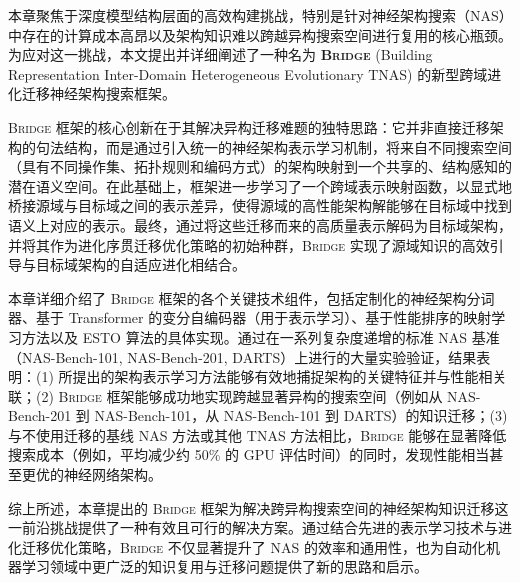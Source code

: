 \documentclass[../main.tex]{subfiles}
\begin{document}
\label{sec:bridge-conclusion}

本章聚焦于深度模型结构层面的高效构建挑战，特别是针对神经架构搜索（NAS）中存在的计算成本高昂以及架构知识难以跨越异构搜索空间进行复用的核心瓶颈。为应对这一挑战，本文提出并详细阐述了一种名为 \textbf{\textsc{Bridge}} (Building Representation Inter-Domain Heterogeneous Evolutionary TNAS) 的新型跨域进化迁移神经架构搜索框架。

\textsc{Bridge} 框架的核心创新在于其解决异构迁移难题的独特思路：它并非直接迁移架构的句法结构，而是通过引入统一的神经架构表示学习机制，将来自不同搜索空间（具有不同操作集、拓扑规则和编码方式）的架构映射到一个共享的、结构感知的潜在语义空间。在此基础上，框架进一步学习了一个跨域表示映射函数，以显式地桥接源域与目标域之间的表示差异，使得源域的高性能架构解能够在目标域中找到语义上对应的表示。最终，通过将这些迁移而来的高质量表示解码为目标域架构，并将其作为进化序贯迁移优化策略的初始种群，\textsc{Bridge} 实现了源域知识的高效引导与目标域架构的自适应进化相结合。

本章详细介绍了 \textsc{Bridge} 框架的各个关键技术组件，包括定制化的神经架构分词器、基于 Transformer 的变分自编码器（用于表示学习）、基于性能排序的映射学习方法以及 ESTO 算法的具体实现。通过在一系列复杂度递增的标准 NAS 基准（NAS-Bench-101, NAS-Bench-201, DARTS）上进行的大量实验验证，结果表明：(1) 所提出的架构表示学习方法能够有效地捕捉架构的关键特征并与性能相关联；(2) \textsc{Bridge} 框架能够成功地实现跨越显著异构的搜索空间（例如从 NAS-Bench-201 到 NAS-Bench-101，从 NAS-Bench-101 到 DARTS）的知识迁移；(3) 与不使用迁移的基线 NAS 方法或其他 TNAS 方法相比，\textsc{Bridge} 能够在显著降低搜索成本（例如，平均减少约 50\% 的 GPU 评估时间）的同时，发现性能相当甚至更优的神经网络架构。

综上所述，本章提出的 \textsc{Bridge} 框架为解决跨异构搜索空间的神经架构知识迁移这一前沿挑战提供了一种有效且可行的解决方案。通过结合先进的表示学习技术与进化迁移优化策略，\textsc{Bridge} 不仅显著提升了 NAS 的效率和通用性，也为自动化机器学习领域中更广泛的知识复用与迁移问题提供了新的思路和启示。
\end{document}
